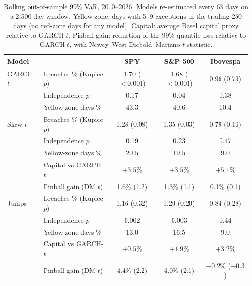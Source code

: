 \documentclass[11pt,a4paper]{article}
\theoremstyle{definition}
\theoremstyle{remark}
\begin{document}
\begin{table}[ht]\centering\footnotesize\setlength{\tabcolsep}{4pt}
\caption{Rolling out-of-sample 99\% VaR, 2010--2026. Models re-estimated every 63 days on a 2{,}500-day window. Yellow zone: days with 5--9 exceptions in the trailing 250 days (no red-zone days for any model). Capital: average Basel capital proxy relative to GARCH-$t$. Pinball gain: reduction of the 99\% quantile loss relative to GARCH-$t$, with Newey--West Diebold--Mariano $t$-statistic.}\label{tab:rolling}
\begin{tabular}{llccc}
\toprule
Model & & SPY & S\&P 500 & Ibovespa\\
\midrule
GARCH-$t$ & Breaches \% (Kupiec $p$) & 1.70 ($<0.001$) & 1.68 ($<0.001$) & 0.96 (0.79)\\
 & Independence $p$ & 0.17 & 0.04 & 0.38\\
 & Yellow-zone days \% & 43.3 & 40.6 & 10.4\\
\addlinespace
Skew-$t$ & Breaches \% (Kupiec $p$) & 1.28 (0.08) & 1.35 (0.03) & 0.79 (0.16)\\
 & Independence $p$ & 0.19 & 0.23 & 0.47\\
 & Yellow-zone days \% & 20.5 & 19.5 & 9.0\\
 & Capital vs GARCH-$t$ & $+3.5\%$ & $+3.5\%$ & $+5.1\%$\\
 & Pinball gain (DM $t$) & 1.6\% (1.2) & 1.3\% (1.1) & 0.1\% (0.1)\\
\addlinespace
Jumps & Breaches \% (Kupiec $p$) & 1.16 (0.32) & 1.20 (0.20) & 0.84 (0.28)\\
 & Independence $p$ & 0.002 & 0.003 & 0.44\\
 & Yellow-zone days \% & 13.0 & 16.5 & 9.0\\
 & Capital vs GARCH-$t$ & $+0.5\%$ & $+1.9\%$ & $+3.2\%$\\
 & Pinball gain (DM $t$) & 4.4\% (2.2) & 4.0\% (2.1) & $-0.2\%$ ($-0.3$)\\
\bottomrule
\end{tabular}
\end{table}
\end{document}
